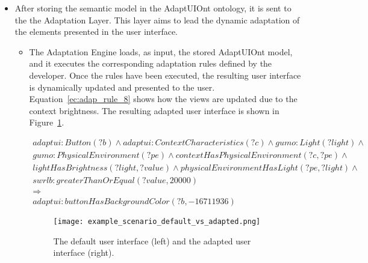\begin{itemize}
  \item After storing the semantic model in the AdaptUIOnt ontology, it is sent
  to the the Adaptation Layer. This layer aims to lead the dynamic adaptation of
  the elements presented in the user interface.
  
  \begin{itemize}
    \item The Adaptation Engine loads, as input, the stored AdaptUIOnt model, 
    and it executes the corresponding adaptation rules defined by the developer. 
    Once the rules have been executed, the resulting user interface is dynamically 
    updated and presented to the user. Equation~\ref{ec:adap_rule_8} shows how
    the views are updated due to the context brightness. The resulting adapted
    user interface is shown in Figure~\ref{fig:example_scenario_default_vs_adapted}.

    \footnotesize
    \begin{equation} \label{ec:adap_rule_8} 
    \begin{align*} 
    adaptui:Button(?b) ∧ adaptui:ContextCharacteristics(?c) ∧ gumo:Light(?light) ∧ \\  
    gumo:PhysicalEnvironment(?pe) ∧ contextHasPhysicalEnvironment(?c, ?pe) ∧ \\ 
    lightHasBrightness(?light, ?value) ∧ physicalEnvironmentHasLight(?pe, ?light) ∧ \\
    swrlb:greaterThanOrEqual(?value, 20000) \\
    \Rightarrow \\
    adaptui:buttonHasBackgroundColor(?b, -16711936)
    \end{align*}
    \end{equation}
    \normalsize
    
    \begin{figure}
    \centering
    \texttt{[image: example\_scenario\_default\_vs\_adapted.png]}
    \caption{The default user interface (left) and the adapted user interface (right).}
    \label{fig:example_scenario_default_vs_adapted}
    \end{figure}
    

\end{itemize}
\end{itemize}
